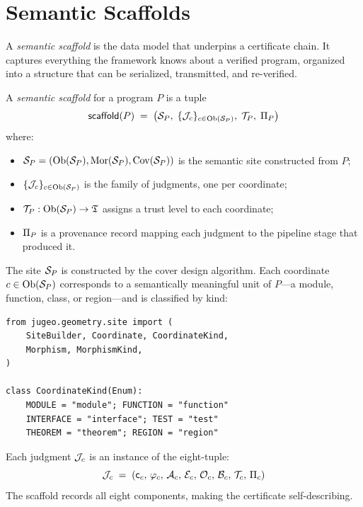 \documentclass[11pt]{article}
\newcommand{\scaffold}{\mathsf{scaffold}}
\begin{document}
\section{Semantic Scaffolds}\label{sec:scaffolds}

A \emph{semantic scaffold} is the data model that underpins a
certificate chain.  It captures everything the \JuGeo{} framework
knows about a verified program, organized into a structure that
can be serialized, transmitted, and re-verified.

\begin{definition}\label{def:scaffold}
A \emph{semantic scaffold} for a \Python{} program $P$ is a tuple
\[
  \scaffold(P) \;=\; \bigl(\Site_P,\;\{\J_c\}_{c \in \Ob(\Site_P)},
  \;\trust_P,\;\prov_P\bigr)
\]
where:
\begin{itemize}
  \item $\mathcal{S}_P = (\mathrm{Ob}(\mathcal{S}_P), \mathrm{Mor}(\mathcal{S}_P), \mathrm{Cov}(\mathcal{S}_P))$ is
    the semantic site constructed from $P$;
  \item $\{\mathcal{J}_c\}_{c \in \mathrm{Ob}(\mathcal{S}_P)}$ is the family of judgments,
    one per coordinate;
  \item $\mathcal{T}_P : \mathrm{Ob}(\mathcal{S}_P) \to \mathfrak{T}$ assigns a trust level
    to each coordinate;
  \item $\Pi_P$ is a provenance record mapping each judgment to
    the pipeline stage that produced it.
\end{itemize}
\end{definition}

The site $\mathcal{S}_P$ is constructed by the \JuGeo{} cover design
algorithm.  Each coordinate $c \in \mathrm{Ob}(\mathcal{S}_P)$ corresponds to a
semantically meaningful unit of $P$---a module, function, class, or
region---and is classified by kind:

\begin{lstlisting}[style=jugeo-python,caption={Coordinate kinds in the JuGeo API.}]
from jugeo.geometry.site import (
    SiteBuilder, Coordinate, CoordinateKind,
    Morphism, MorphismKind,
)

class CoordinateKind(Enum):
    MODULE = "module"; FUNCTION = "function"
    INTERFACE = "interface"; TEST = "test"
    THEOREM = "theorem"; REGION = "region"
\end{lstlisting}

Each judgment $\mathcal{J}_c$ is an instance of the \JuGeo{} eight-tuple:
\[
  \mathcal{J}_c \;=\; (\mathsf{c}_c,\,\varphi_c,\,\mathcal{A}_c,\,\mathcal{E}_c,\,\mathcal{O}_c,\,\mathcal{B}_c,\,\mathcal{T}_c,\,\Pi_c)
\]
The scaffold records all eight components, making the certificate
self-describing.
\end{document}
